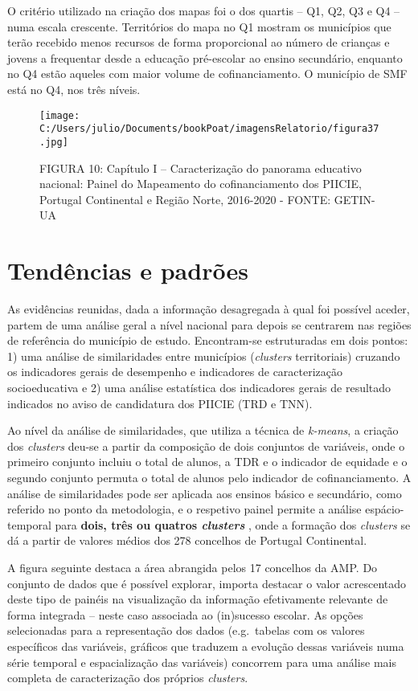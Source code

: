 \documentclass[
]{book}
\begin{document}
O critério utilizado na criação dos mapas foi o dos quartis -- Q1, Q2, Q3 e Q4 -- numa escala crescente. Territórios do mapa no Q1 mostram os municípios que terão recebido menos recursos de forma proporcional ao número de crianças e jovens a frequentar desde a educação pré-escolar ao ensino secundário, enquanto no Q4 estão aqueles com maior volume de cofinanciamento. O município de SMF está no Q4, nos três níveis.

\begin{figure}
\centering
\texttt{[image: C:/Users/julio/Documents/bookPoat/imagensRelatorio/figura37.jpg]}
\caption{FIGURA 10: Capítulo I -- Caracterização do panorama educativo nacional: Painel do Mapeamento do cofinanciamento dos PIICIE, Portugal Continental e Região Norte, 2016-2020 - FONTE: GETIN-UA}
\end{figure}

\hypertarget{tenduxeancias-e-padruxf5es}{%
\section{\texorpdfstring{\textbf{Tendências e padrões}}{Tendências e padrões}}\label{tenduxeancias-e-padruxf5es}}

As evidências reunidas, dada a informação desagregada à qual foi possível aceder, partem de uma análise geral a nível nacional para depois se centrarem nas regiões de referência do município de estudo. Encontram-se estruturadas em dois pontos: 1) uma análise de similaridades entre municípios (\emph{clusters} territoriais) cruzando os indicadores gerais de desempenho e indicadores de caracterização socioeducativa e 2) uma análise estatística dos indicadores gerais de resultado indicados no aviso de candidatura dos PIICIE (TRD e TNN).

Ao nível da análise de similaridades, que utiliza a técnica de \emph{k-means}, a criação dos \emph{clusters} deu-se a partir da composição de dois conjuntos de variáveis, onde o primeiro conjunto incluiu o total de alunos, a TDR e o indicador de equidade e o segundo conjunto permuta o total de alunos pelo indicador de cofinanciamento. A análise de similaridades pode ser aplicada aos ensinos básico e secundário, como referido no ponto da metodologia, e o respetivo painel permite a análise espácio-temporal para \textbf{dois, três ou quatros \emph{clusters} }, onde a formação dos \emph{clusters} se dá a partir de valores médios dos 278 concelhos de Portugal Continental.

A figura seguinte destaca a área abrangida pelos 17 concelhos da AMP. Do conjunto de dados que é possível explorar, importa destacar o valor acrescentado deste tipo de painéis na visualização da informação efetivamente relevante de forma integrada -- neste caso associada ao (in)sucesso escolar. As opções selecionadas para a representação dos dados (e.g.~tabelas com os valores específicos das variáveis, gráficos que traduzem a evolução dessas variáveis numa série temporal e espacialização das variáveis) concorrem para uma análise mais completa de caracterização dos próprios \emph{clusters}.
\end{document}
